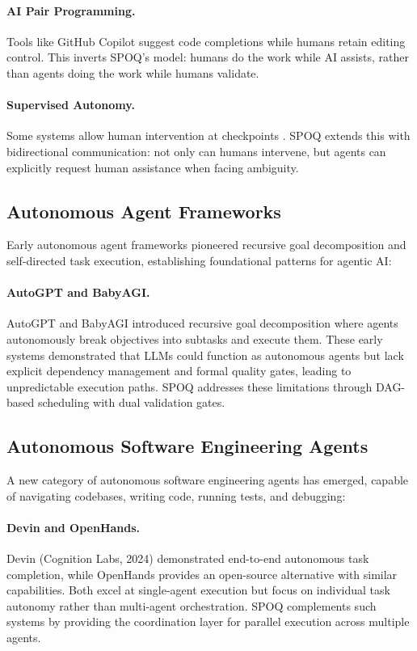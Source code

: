 \paragraph{AI Pair Programming.} Tools like GitHub Copilot \citep{chen2021codex}
suggest code completions while humans retain editing control. This inverts SPOQ's
model: humans do the work while AI assists, rather than agents doing the work
while humans validate.

\paragraph{Supervised Autonomy.} Some systems allow human intervention at
checkpoints \citep{wu2023autogen}. SPOQ extends this with bidirectional
communication: not only can humans intervene, but agents can explicitly
request human assistance when facing ambiguity.

\subsection{Autonomous Agent Frameworks}

Early autonomous agent frameworks pioneered recursive goal decomposition and
self-directed task execution, establishing foundational patterns for agentic AI:

\paragraph{AutoGPT and BabyAGI.}
AutoGPT \citep{autogpt2023} and BabyAGI \citep{babyagi2023} introduced recursive
goal decomposition where agents autonomously break objectives into subtasks and
execute them. These early systems demonstrated that LLMs could function as
autonomous agents but lack explicit dependency management and formal quality
gates, leading to unpredictable execution paths. SPOQ addresses these limitations
through DAG-based scheduling with dual validation gates.

\subsection{Autonomous Software Engineering Agents}

A new category of autonomous software engineering agents has emerged, capable
of navigating codebases, writing code, running tests, and debugging:

\paragraph{Devin and OpenHands.}
Devin (Cognition Labs, 2024) \citep{cognition2024devin} demonstrated end-to-end
autonomous task completion, while OpenHands \citep{wang2024openhands} provides
an open-source alternative with similar capabilities. Both excel at single-agent
execution but focus on individual task autonomy rather than multi-agent
orchestration. SPOQ complements such systems by providing the coordination
layer for parallel execution across multiple agents.

